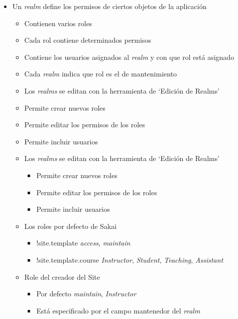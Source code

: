 \begin{itemize}
\begin{itemize}
 \item Un \textit{realm} define los permisos de ciertos objetos de la aplicación

\begin{itemize}
\item Contienen varios roles
\item Cada rol contiene determinados permisos
\item Contiene los usuarios asignados al \textit{realm} y con que rol está
asignado
\item Cada \textit{realm} indica que rol es el de mantenimiento
\item Los \textit{realms} se editan con la herramienta de ‘Edición de Realms’
\item Permite crear nuevos roles
\item Permite editar los permisos de los roles
\item Permite incluir usuarios
\end{itemize}

\begin{itemize}
 \item Los \textit{realms} se editan con la herramienta de ‘Edición de Realms’

\begin{itemize}
\item Permite crear nuevos roles
\item Permite editar los permisos de los roles
\item Permite incluir usuarios
\end{itemize}


\item Los roles por defecto de Sakai

\begin{itemize}
\item $!$site.template \rightsquigarrow  \textit{access}, \textit{maintain}

\item $!$site.template.course \rightsquigarrow \textit{Instructor},
\textit{Student}, \textit{Teaching}, \textit{Assistant}
\end{itemize}

\item Role del creador del Site

\begin{itemize}
 \item Por defecto \textit{maintain}, \textit{Instructor}
\item Está especificado por el campo mantenedor del \textit{realm}
\end{itemize}


\end{itemize}
\end{itemize}
\end{itemize}



